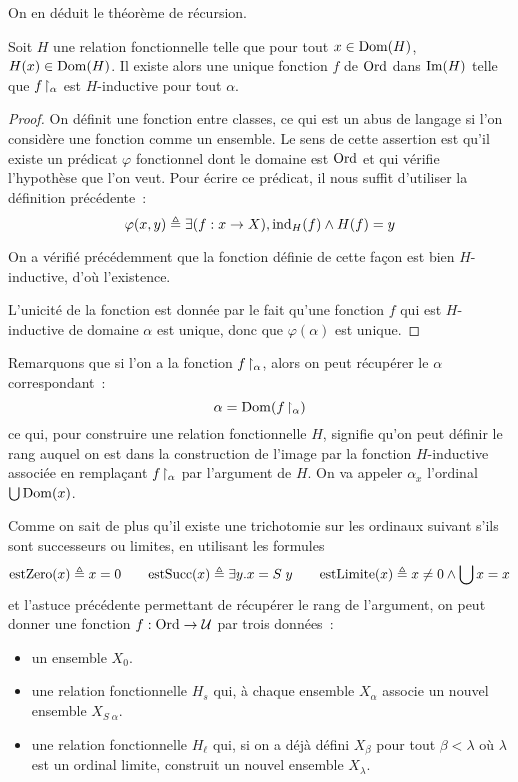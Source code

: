 On en déduit le théorème de récursion.

\begin{theorem}\label{thm.recurs.transf}
  Soit $H$ une relation fonctionnelle telle que pour tout $x\in \operatorname{Dom}(H)$,
  $H(x)\in\operatorname{Dom}(H)$. Il existe alors une unique fonction $f$ de $\operatorname{Ord}$ dans
  $\operatorname{Im}(H)$ telle que $f\!\upharpoonright_{\alpha}$ est $H$-inductive pour tout $\alpha$.
\end{theorem}

\begin{proof}
  On définit une fonction entre classes, ce qui est un abus de langage si l'on
  considère une fonction comme un ensemble. Le sens de cette assertion est qu'il
  existe un prédicat $\varphi$ fonctionnel dont le domaine est $\operatorname{Ord}$ et qui
  vérifie l'hypothèse que l'on veut. Pour écrire ce prédicat, il nous suffit
  d'utiliser la définition précédente~:
  \[\varphi(x,y) \triangleq \exists (f : x \to X),
  \mathrm{ind}_H(f)\land H(f) = y\]

  On a vérifié précédemment que la fonction définie de cette façon est bien
  $H$-inductive, d'où l'existence.

  L'unicité de la fonction est donnée par le fait qu'une fonction $f$ qui est
  $H$-inductive de domaine $\alpha$ est unique, donc que $\varphi(\alpha)$ est
  unique.
\end{proof}

Remarquons que si l'on a la fonction $f\!\upharpoonright_{\alpha}$, alors on peut récupérer
le $\alpha$ correspondant~:
\[\alpha = \operatorname{Dom}(f\!\upharpoonright_{\alpha})\]
ce qui, pour construire une relation fonctionnelle $H$, signifie qu'on peut
définir le rang auquel on est dans la construction de l'image par la fonction
$H$-inductive associée en remplaçant $f\!\upharpoonright_{\alpha}$ par l'argument de $H$.
On va appeler $\alpha_x$ l'ordinal $\bigcup\operatorname{Dom}(x)$.

Comme on sait de plus qu'il existe une trichotomie sur les ordinaux suivant
s'ils sont successeurs ou limites, en utilisant les formules
\[\mathrm{estZero}(x) \triangleq x = 0\qquad
\mathrm{estSucc}(x)\triangleq \exists y. x = S\;y \qquad
\mathrm{estLimite}(x)\triangleq x \neq 0 \land \bigcup x = x\]
et l'astuce précédente permettant de récupérer le rang de l'argument, on peut
donner une fonction $f : \operatorname{Ord} \to \mathcal U$ par trois données~:
\begin{itemize}
\item un ensemble $X_0$.
\item une relation fonctionnelle $H_s$ qui, à chaque ensemble $X_\alpha$ associe
  un nouvel ensemble $X_{S\;\alpha}$.
\item une relation fonctionnelle $H_\ell$ qui, si on a déjà défini $X_\beta$ pour
  tout $\beta < \lambda$ où $\lambda$ est un ordinal limite, construit un nouvel
  ensemble $X_\lambda$.
\end{itemize}

